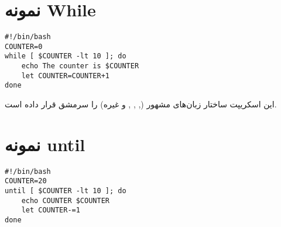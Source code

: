 \section*{نمونه {\codefont While}}
\begin{latin}
\begin{lstlisting}
#!/bin/bash
COUNTER=0
while [ $COUNTER -lt 10 ]; do
	echo The counter is $COUNTER
	let COUNTER=COUNTER+1
done
\end{lstlisting}
\end{latin}
این اسکریپت ساختار  زبان‌های مشهور (, , , و غیره) را سرمشق قرار داده
است.

\section*{نمونه {\codefont until}}
\begin{latin}
\begin{lstlisting}
#!/bin/bash
COUNTER=20
until [ $COUNTER -lt 10 ]; do
	echo COUNTER $COUNTER
	let COUNTER-=1
done
\end{lstlisting}
\end{latin}